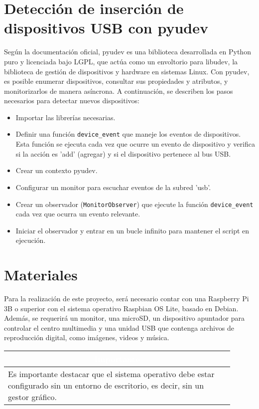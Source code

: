 \documentclass[report,12pt]{article}
\begin{document}
	\section{Detección de inserción de dispositivos USB con pyudev }
	

	Según la documentación oficial, pyudev es una biblioteca desarrollada en Python puro y licenciada bajo LGPL, que actúa como un envoltorio para libudev, la biblioteca de gestión de dispositivos y hardware en sistemas Linux. Con pyudev, es posible enumerar dispositivos, consultar sus propiedades y atributos, y monitorizarlos de manera asíncrona. A continuación, se describen los pasos necesarios para detectar nuevos dispositivos:
	
	\begin{itemize}[label=$\bullet$, itemsep=0pt]
		\item Importar las librerías necesarias.
		\item Definir una función \texttt{device\_event} que maneje los eventos de dispositivos. Esta función se ejecuta cada vez que ocurre un evento de dispositivo y verifica si la acción es 'add' (agregar) y si el dispositivo pertenece al bus USB.
		\item Crear un contexto pyudev.
		\item Configurar un monitor para escuchar eventos de la subred 'usb'.
		\item Crear un observador (\texttt{MonitorObserver}) que ejecute la función \texttt{device\_event} cada vez que ocurra un evento relevante.
		\item Iniciar el observador y entrar en un bucle infinito para mantener el script en ejecución.
	\end{itemize}
	
	\section{Materiales}
	Para la realización de este proyecto, será necesario contar con una Raspberry Pi 3B o superior con el sistema operativo Raspbian OS Lite, basado en Debian. Además, se requerirá un monitor, una microSD, un dispositivo apuntador para controlar el centro multimedia y una unidad USB que contenga archivos de reproducción digital, como imágenes, videos y música. 

	\begin{center}
	\renewcommand{\arraystretch}{1.5}
	\setlength{\arrayrulewidth}{1pt}
	\begin{tabular}{|p{0.9\linewidth}|}
		\hline
		\multicolumn{1}{|c|}{\cellcolor{red}\textcolor{white}{\textbf{Importante}}} \\
		\hline
		Es importante destacar que el sistema operativo debe estar configurado sin un entorno de escritorio, es decir, sin un gestor gráfico. \\
		\hline
	\end{tabular}
	\end{center}
\end{document}
